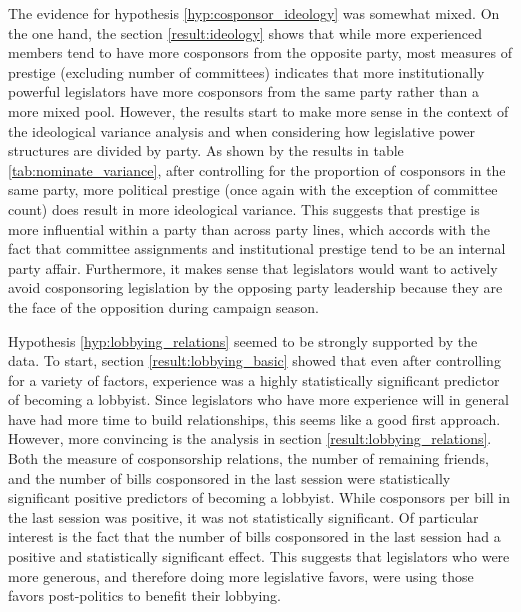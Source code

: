 \documentclass{article}
\begin{document}
  The evidence for hypothesis \ref{hyp:cosponsor_ideology} was somewhat mixed. On the one hand, the section \ref{result:ideology} shows that while more experienced members tend to have more cosponsors from the opposite party, most measures of prestige (excluding number of committees) indicates that more institutionally powerful legislators have more cosponsors from the same party rather than a more mixed pool. However, the results start to make more sense in the context of the ideological variance analysis and when considering how legislative power structures are divided by party. As shown by the results in table \ref{tab:nominate_variance}, after controlling for the proportion of cosponsors in the same party, more political prestige (once again with the exception of committee count) does result in more ideological variance. This suggests that prestige is more influential within a party than across party lines, which accords with the fact that committee assignments and institutional prestige tend to be an internal party affair. Furthermore, it makes sense that legislators would want to actively avoid cosponsoring legislation by the opposing party leadership because they are the face of the opposition during campaign season. 

  Hypothesis \ref{hyp:lobbying_relations} seemed to be strongly supported by the data. To start, section \ref{result:lobbying_basic} showed that even after controlling for a variety of factors, experience was a highly statistically significant predictor of becoming a lobbyist. Since legislators who have more experience will in general have had more time to build relationships, this seems like a good first approach. However, more convincing is the analysis in section \ref{result:lobbying_relations}. Both the measure of cosponsorship relations, the number of remaining friends, and the number of bills cosponsored in the last session were statistically significant positive predictors of becoming a lobbyist. While cosponsors per bill in the last session was positive, it was not statistically significant. Of particular interest is the fact that the number of bills cosponsored in the last session had a positive and statistically significant effect. This suggests that legislators who were more generous, and therefore doing more legislative favors, were using those favors post-politics to benefit their lobbying. 
\end{document}
